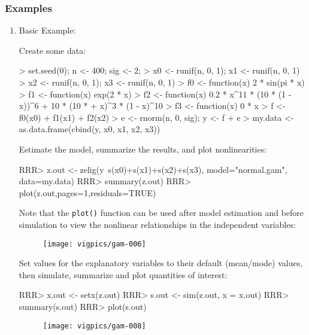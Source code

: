 \subsubsection{Examples}
\begin{enumerate}
\item Basic Example:

Create some data:

\begin{Schunk}
\begin{Sinput}
> set.seed(0);  n <- 400; sig <- 2; 
> x0 <- runif(n, 0, 1);  x1 <- runif(n, 0, 1)
> x2 <- runif(n, 0, 1);  x3 <- runif(n, 0, 1)
> f0 <- function(x) 2 * sin(pi * x)
> f1 <- function(x) exp(2 * x)
> f2 <- function(x) 0.2 * x^11 * (10 * (1 - x))^6 + 10 * (10 * 
+     x)^3 * (1 - x)^10
> f3 <- function(x) 0 * x
> f <- f0(x0) + f1(x1) + f2(x2)
> e <- rnorm(n, 0, sig); y <- f + e
> my.data <- as.data.frame(cbind(y, x0, x1, x2, x3))
\end{Sinput}
\end{Schunk}

Estimate the model, summarize the results, and plot nonlinearities:

\begin{Schunk}
\begin{Sinput}
RRR> z.out <- zelig(y~s(x0)+s(x1)+s(x2)+s(x3), model="normal.gam", data=my.data)
RRR> summary(z.out)
RRR> plot(z.out,pages=1,residuals=TRUE)
\end{Sinput}
\end{Schunk}
Note that the {\tt plot()} function can be used after model estimation and before simulation to view the nonlinear relationships in the independent variables: 

\begin{figure}[here]
\centering
\texttt{[image: vigpics/gam-006]}
\label{fig:plotgam}
\end{figure}

Set values for the explanatory variables to their default (mean/mode) values, then simulate, summarize and plot quantities of interest:
\begin{Schunk}
\begin{Sinput}
RRR>  x.out <- setx(z.out)
RRR>  s.out <- sim(z.out, x = x.out) 
RRR>  summary(s.out) 
RRR>  plot(s.out) 
\end{Sinput}
\end{Schunk}

\begin{figure}[here]
\centering
\texttt{[image: vigpics/gam-008]}
\label{fig:plotgam}
\end{figure}


\end{enumerate}
